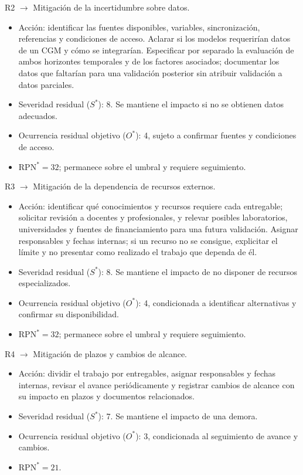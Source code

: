 \noindent R2 $\rightarrow$ Mitigación de la incertidumbre sobre datos.
\begin{itemize}
    \item Acción: identificar las fuentes disponibles, variables, sincronización, referencias y condiciones de acceso. Aclarar si los modelos requerirían datos de un CGM y cómo se integrarían. Especificar por separado la evaluación de ambos horizontes temporales y de los factores asociados; documentar los datos que faltarían para una validación posterior sin atribuir validación a datos parciales.
    \item Severidad residual ($S^{*}$): 8. Se mantiene el impacto si no se obtienen datos adecuados.
    \item Ocurrencia residual objetivo ($O^{*}$): 4, sujeto a confirmar fuentes y condiciones de acceso.
    \item $\mathrm{RPN}^{*} = 32$; permanece sobre el umbral y requiere seguimiento.
\end{itemize}

\noindent R3 $\rightarrow$ Mitigación de la dependencia de recursos externos.
\begin{itemize}
    \item Acción: identificar qué conocimientos y recursos requiere cada entregable; solicitar revisión a docentes y profesionales, y relevar posibles laboratorios, universidades y fuentes de financiamiento para una futura validación. Asignar responsables y fechas internas; si un recurso no se consigue, explicitar el límite y no presentar como realizado el trabajo que dependa de él.
    \item Severidad residual ($S^{*}$): 8. Se mantiene el impacto de no disponer de recursos especializados.
    \item Ocurrencia residual objetivo ($O^{*}$): 4, condicionada a identificar alternativas y confirmar su disponibilidad.
    \item $\mathrm{RPN}^{*} = 32$; permanece sobre el umbral y requiere seguimiento.
\end{itemize}

\noindent R4 $\rightarrow$ Mitigación de plazos y cambios de alcance.
\begin{itemize}
    \item Acción: dividir el trabajo por entregables, asignar responsables y fechas internas, revisar el avance periódicamente y registrar cambios de alcance con su impacto en plazos y documentos relacionados.
    \item Severidad residual ($S^{*}$): 7. Se mantiene el impacto de una demora.
    \item Ocurrencia residual objetivo ($O^{*}$): 3, condicionada al seguimiento de avance y cambios.
    \item $\mathrm{RPN}^{*} = 21$.
\end{itemize}

